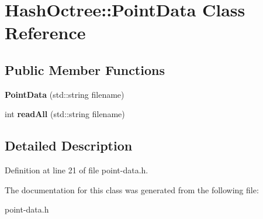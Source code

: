 \hypertarget{class_hash_octree_1_1_point_data}{}\section{Hash\+Octree\+::Point\+Data Class Reference}
\label{class_hash_octree_1_1_point_data}
\subsection*{Public Member Functions}
\begin{DoxyCompactItemize}
\item 
\mbox{\label{class_hash_octree_1_1_point_data_a0154babe173c2519eac574ccdaf9ea53}} 
{\bfseries Point\+Data} (std\+::string filename)
\item 
\mbox{\label{class_hash_octree_1_1_point_data_ae02ff3b9e5b2ab4dd2c9c43785a16c68}} 
int {\bfseries read\+All} (std\+::string filename)
\end{DoxyCompactItemize}


\subsection{Detailed Description}


Definition at line 21 of file point-\/data.\+h.



The documentation for this class was generated from the following file\+:\begin{DoxyCompactItemize}
\item 
point-\/data.\+h\end{DoxyCompactItemize}
